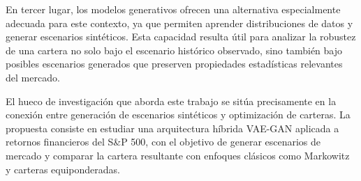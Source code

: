 En tercer lugar, los modelos generativos ofrecen una alternativa especialmente adecuada para este contexto, ya que permiten aprender distribuciones de datos y generar escenarios sintéticos. Esta capacidad resulta útil para analizar la robustez de una cartera no solo bajo el escenario histórico observado, sino también bajo posibles escenarios generados que preserven propiedades estadísticas relevantes del mercado.

El hueco de investigación que aborda este trabajo se sitúa precisamente en la conexión entre generación de escenarios sintéticos y optimización de carteras. La propuesta consiste en estudiar una arquitectura híbrida VAE-GAN aplicada a retornos financieros del S\&P 500, con el objetivo de generar escenarios de mercado y comparar la cartera resultante con enfoques clásicos como Markowitz y carteras equiponderadas.
